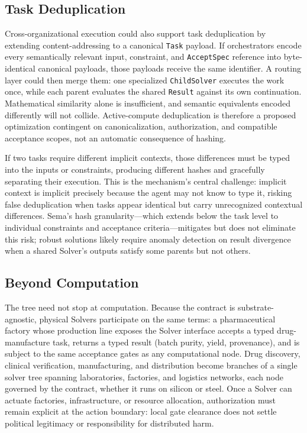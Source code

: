 \documentclass[11pt]{article}
\let\oldtexttt\texttt
\renewcommand{\texttt}[1]{\oldtexttt{\small #1}}
\begin{document}
\subsection{Task Deduplication}

Cross-organizational execution could also support task deduplication by extending content-addressing to a canonical \texttt{Task} payload. If orchestrators encode every semantically relevant input, constraint, and \texttt{AcceptSpec} reference into byte-identical canonical payloads, those payloads receive the same identifier. A routing layer could then merge them: one specialized \texttt{ChildSolver} executes the work once, while each parent evaluates the shared \texttt{Result} against its own continuation. Mathematical similarity alone is insufficient, and semantic equivalents encoded differently will not collide. Active-compute deduplication is therefore a proposed optimization contingent on canonicalization, authorization, and compatible acceptance scopes, not an automatic consequence of hashing.

If two tasks require different implicit contexts, those differences must be typed into the inputs or constraints, producing different hashes and gracefully separating their execution. This is the mechanism's central challenge: implicit context is implicit precisely because the agent may not know to type it, risking false deduplication when tasks appear identical but carry unrecognized contextual differences. Sema's hash granularity---which extends below the task level to individual constraints and acceptance criteria---mitigates but does not eliminate this risk; robust solutions likely require anomaly detection on result divergence when a shared Solver's outputs satisfy some parents but not others.

\subsection{Beyond Computation}

The tree need not stop at computation. Because the contract is substrate-agnostic, physical Solvers participate on the same terms: a pharmaceutical factory whose production line exposes the Solver interface accepts a typed drug-manufacture task, returns a typed result (batch purity, yield, provenance), and is subject to the same acceptance gates as any computational node. Drug discovery, clinical verification, manufacturing, and distribution become branches of a single solver tree spanning laboratories, factories, and logistics networks, each node governed by the contract, whether it runs on silicon or steel. Once a Solver can actuate factories, infrastructure, or resource allocation, authorization must remain explicit at the action boundary: local gate clearance does not settle political legitimacy or responsibility for distributed harm.
\end{document}
